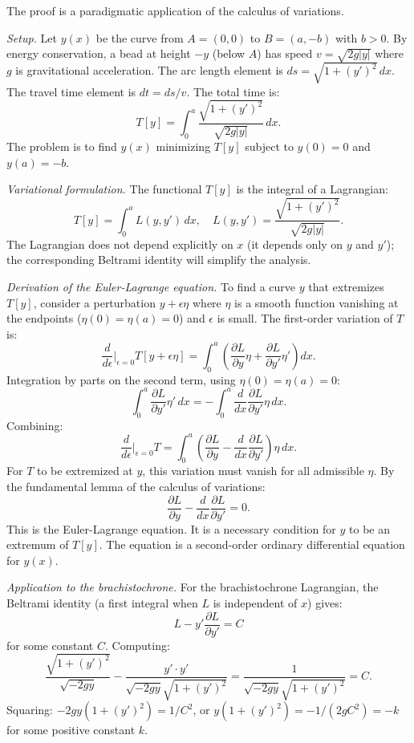 The proof is a paradigmatic application of the calculus of variations.

\emph{Setup.} Let $y(x)$ be the curve from $A = (0, 0)$ to $B = (a,
-b)$ with $b > 0$. By energy conservation, a bead at height $-y$
(below $A$) has speed $v = \sqrt{2g|y|}$ where $g$ is gravitational
acceleration. The arc length element is $ds = \sqrt{1 + (y')^2} \,
dx$. The travel time element is $dt = ds/v$. The total time is:
\[
T[y] = \int_0^a \frac{\sqrt{1 + (y')^2}}{\sqrt{2g|y|}} \, dx.
\]
The problem is to find $y(x)$ minimizing $T[y]$ subject to $y(0) =
0$ and $y(a) = -b$.

\emph{Variational formulation.} The functional $T[y]$ is the
integral of a Lagrangian:
\[
T[y] = \int_0^a L(y, y') \, dx, \quad L(y, y') = \frac{\sqrt{1 +
(y')^2}}{\sqrt{2g|y|}}.
\]
The Lagrangian does not depend explicitly on $x$ (it depends only on
$y$ and $y'$); the corresponding Beltrami identity will simplify
the analysis.

\emph{Derivation of the Euler-Lagrange equation.} To find a curve
$y$ that extremizes $T[y]$, consider a perturbation $y + \epsilon
\eta$ where $\eta$ is a smooth function vanishing at the endpoints
($\eta(0) = \eta(a) = 0$) and $\epsilon$ is small. The first-order
variation of $T$ is:
\[
\frac{d}{d\epsilon}\bigg|_{\epsilon=0} T[y + \epsilon \eta] =
\int_0^a \left(\frac{\partial L}{\partial y} \eta + \frac{\partial
L}{\partial y'} \eta'\right) dx.
\]
Integration by parts on the second term, using $\eta(0) = \eta(a) =
0$:
\[
\int_0^a \frac{\partial L}{\partial y'} \eta' \, dx = -\int_0^a
\frac{d}{dx}\frac{\partial L}{\partial y'} \eta \, dx.
\]
Combining:
\[
\frac{d}{d\epsilon}\bigg|_{\epsilon=0} T = \int_0^a \left(\frac{\partial
L}{\partial y} - \frac{d}{dx}\frac{\partial L}{\partial y'}\right)
\eta \, dx.
\]
For $T$ to be extremized at $y$, this variation must vanish for all
admissible $\eta$. By the fundamental lemma of the calculus of
variations:
\[
\frac{\partial L}{\partial y} - \frac{d}{dx}\frac{\partial
L}{\partial y'} = 0.
\]
This is the Euler-Lagrange equation. It is a necessary condition for
$y$ to be an extremum of $T[y]$. The equation is a second-order
ordinary differential equation for $y(x)$.

\emph{Application to the brachistochrone.} For the brachistochrone
Lagrangian, the Beltrami identity (a first integral when $L$ is
independent of $x$) gives:
\[
L - y' \frac{\partial L}{\partial y'} = C
\]
for some constant $C$. Computing:
\[
\frac{\sqrt{1 + (y')^2}}{\sqrt{-2gy}} - \frac{y' \cdot y'}{\sqrt{-2gy}
\sqrt{1 + (y')^2}} = \frac{1}{\sqrt{-2gy}\sqrt{1 + (y')^2}} = C.
\]
Squaring: $-2gy(1 + (y')^2) = 1/C^2$, or $y(1 + (y')^2) = -1/(2gC^2)
= -k$ for some positive constant $k$.

